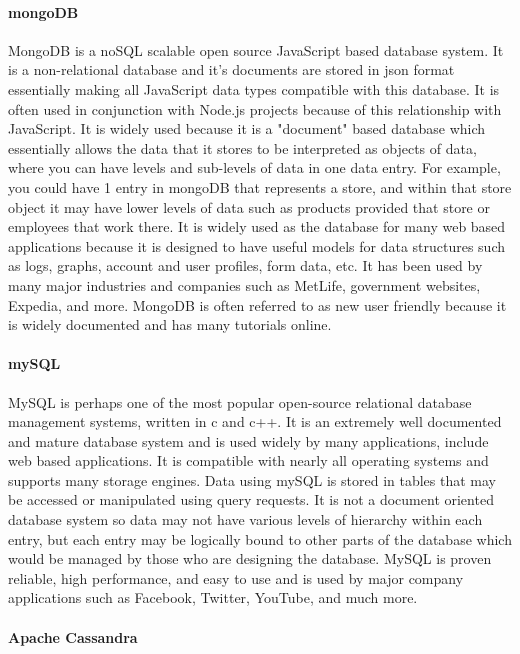 	\paragraph{mongoDB}
	
		MongoDB is a noSQL scalable open source JavaScript based database system. It is a non-relational database and it's documents are stored in json format essentially making all JavaScript data types compatible with this
		database. It is often used in conjunction with Node.js projects because of this relationship with JavaScript. It is widely used because it is a "document" based
		database which essentially allows the data that it stores to be interpreted as objects of data, where you can have levels and sub-levels of data in one data entry.
		For example, you could have 1 entry in mongoDB that represents a store, and within that store object it may have lower levels of data such as products provided that store 
		or employees that work there. It is widely used as the database for many web based applications because it is designed to have useful models for data structures
		such as logs, graphs, account and user profiles, form data, etc. It has been used by many major industries and companies such as MetLife, government websites, Expedia, and more.
		MongoDB is often referred to as new user friendly because it is widely documented and has many tutorials online. 
		
	\paragraph{mySQL}	
	
		MySQL is perhaps one of the most popular open-source relational database management systems, written in c and c++. It is an extremely well documented and mature database system and 
		is used widely by many applications, include web based applications. It is compatible with nearly all operating systems and supports many storage engines. Data 
		using mySQL is stored in tables that may be accessed or manipulated using query requests. It is not a document oriented database system so data may not have 
		various levels of hierarchy within each entry, but each entry may be logically bound to other parts of the database which would be managed by those who
		are designing the database. MySQL is proven reliable, high performance, and easy to use and is used by major company applications such as Facebook, Twitter, YouTube, and much more.

	\paragraph{Apache Cassandra}
	
